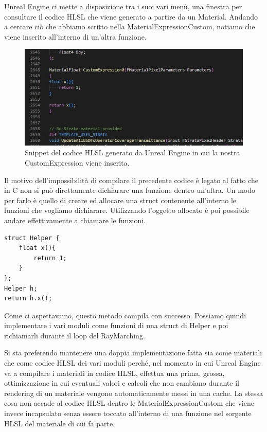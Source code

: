 \documentclass[main.tex]{subfiles}
\begin{document}
\noindent Unreal Engine ci mette a disposizione tra i suoi vari menù, una finestra per consultare il codice HLSL che viene generato a partire da un Material. Andando a cercare ciò che abbiamo scritto nella MaterialExpressionCustom, notiamo che viene inserito all'interno di un'altra funzione.
\begin{figure}[H] %
    \centering
    \includegraphics[width=0.8\linewidth]{img/renderingPipeline/hlslFunInUn.jpg}
    \caption{Snippet del codice HLSL generato da Unreal Engine in cui la nostra CustomExpression viene inserita.}
    \label{fig:2_funcInFunc}
\end{figure}

\noindent Il motivo dell'impossibilità di compilare il precedente codice è legato al fatto che in C non si può direttamente dichiarare una funzione dentro un'altra. Un modo per farlo è quello di creare ed allocare una struct contenente all'interno le funzioni che vogliamo dichiarare. Utilizzando l'oggetto allocato è poi possibile andare effettivamente a chiamare le funzioni.
\begin{lstlisting}
struct Helper {
    float x(){
        return 1;
    }
};
Helper h;
return h.x();
\end{lstlisting}
Come ci aspettavamo, questo metodo compila con successo. Possiamo quindi implementare i vari moduli come funzioni di una struct di Helper e poi richiamarli durante il loop del RayMarching. \newline

Si sta preferendo mantenere una doppia implementazione fatta sia come materiali che come codice HLSL dei vari moduli perché, nel momento in cui Unreal Engine va a compilare i materiali in codice HLSL, effettua una prima, grossa, ottimizzazione in cui eventuali valori e calcoli che non cambiano durante il rendering di un materiale vengono automaticamente messi in una cache. La stessa cosa non accade al codice HLSL dentro le MaterialExpressionCustom che viene invece incapsulato senza essere toccato all'interno di una funzione nel sorgente HLSL del materiale di cui fa parte. \cite{hlslNoOptimize}
\end{document}
